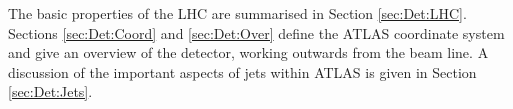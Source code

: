 The basic properties of the LHC are summarised in Section \ref{sec:Det:LHC}. 
Sections \ref{sec:Det:Coord} and \ref{sec:Det:Over} define the ATLAS coordinate system and give an overview of the detector, working outwards from the beam line.
A discussion of the important aspects of jets within ATLAS is given in Section \ref{sec:Det:Jets}.
